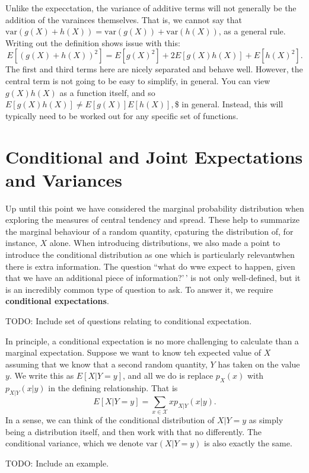 \documentclass[
  letterpaper,
  DIV=11,
  numbers=noendperiod]{scrreprt}
\begin{document}
Unlike the expecctation, the variance of additive terms will not
generally be the addition of the varainces themselves. That is, we
cannot say that
\(\text{var}(g(X) + h(X)) = \text{var}(g(X)) + \text{var}(h(X))\), as a
general rule. Writing out the definition shows issue with this:
\[E[(g(X) + h(X))^2] = E[g(X)^2] + 2E[g(X)h(X)] + E[h(X)^2].\] The first
and third terms here are nicely separated and behave well. However, the
central term is not going to be easy to simplify, in general. You can
view \(g(X)h(X)\) as a function itself, and so
\(E[g(X)h(X)] \neq E[g(X)]E[h(X)],\)\$ in general. Instead, this will
typically need to be worked out for any specific set of functions.

\section{Conditional and Joint Expectations and
Variances}\label{conditional-and-joint-expectations-and-variances}

Up until this point we have considered the marginal probability
distribution when exploring the measures of central tendency and spread.
These help to summarize the marginal behaviour of a random quantity,
cpaturing the distribution of, for instance, \(X\) alone. When
introducing distributions, we also made a point to introduce the
conditional distribution as one which is particularly relevantwhen there
is extra information. The question ``what do wwe expect to happen, given
that we have an additional piece of information?'\,' is not only
well-defined, but it is an incredibly common type of question to ask. To
answer it, we require \textbf{conditional expectations}.

TODO: Include set of questions relating to conditional expectation.

In principle, a conditional expectation is no more challenging to
calculate than a marginal expectation. Suppose we want to know teh
expected value of \(X\) assuming that we know that a second random
quantity, \(Y\) has taken on the value \(y\). We write this as
\(E[X|Y=y]\), and all we do is replace \(p_X(x)\) with \(p_{X|Y}(x|y)\)
in the defining relationship. That is
\[E[X|Y=y] = \sum_{x\in\mathcal{X}}xp_{X|Y}(x|y).\] In a sense, we can
think of the conditional distribution of \(X|Y=y\) as simply being a
distribution itself, and then work with that no differently. The
conditional variance, which we denote \(\text{var}(X|Y=y)\) is also
exactly the same.

TODO: Include an example.
\end{document}

